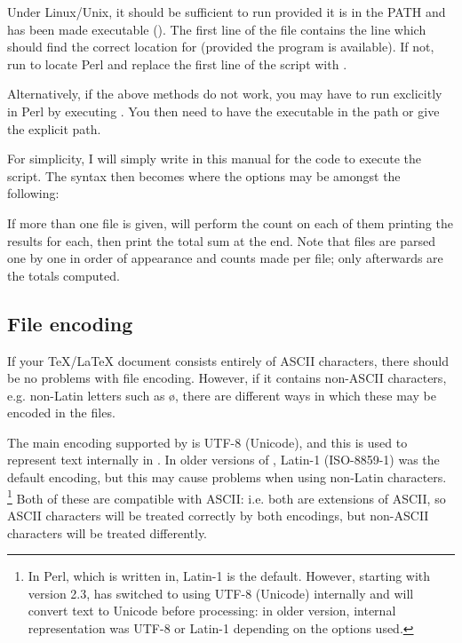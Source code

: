 \documentclass{article}
\begin{document}
Under Linux/Unix, it should be sufficient to run  provided it is in the PATH and has been made executable (). The first line of the file contains the line  which should find the correct location for  (provided the program  is available). If not, run  to locate Perl and replace the first line of the script with .

Alternatively, if the above methods do not work, you may have to run \TeXcount{} exclicitly in Perl by executing . You then need to have the  executable in the path or give the explicit path.

For simplicity, I will simply write  in this manual for the code to execute the script. The syntax then becomes
where the options may be amongst the following:



If more than one file is given, \TeXcount{} will perform the count on each of them printing the results for each, then print the total sum at the end. Note that files are parsed one by one in order of appearance and counts made per file; only afterwards are the totals computed. 


\subsection{File encoding}

If your \TeX/\LaTeX{} document consists entirely of ASCII characters, there should be no problems with file encoding. However, if it contains non-ASCII characters, e.g. non-Latin letters such as \o{}, there are different ways in which these may be encoded in the files.

The main encoding supported by \TeXcount{} is UTF-8 (Unicode), and this is used to represent text internally in \TeXcount{}. In older versions of \TeXcount{}, Latin-1 (ISO-8859-1) was the default encoding, but this may cause problems when using non-Latin characters.%
\footnote{%
In Perl, which \TeXcount{} is written in, Latin-1 is the default. However, starting with version 2.3, \TeXcount{} has switched to using UTF-8 (Unicode) internally and will convert text to Unicode before processing: in older version, internal representation was UTF-8 or Latin-1 depending on the options used.}
Both of these are compatible with ASCII: i.e. both are extensions of ASCII, so ASCII characters will be treated correctly by both encodings, but non-ASCII characters will be treated differently.
\end{document}
